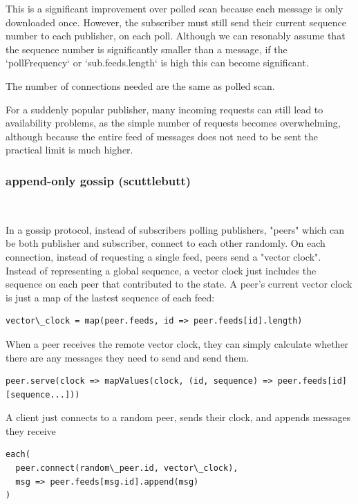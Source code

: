 \documentclass[sigconf]{acmart}
\begin{document}
This is a significant improvement over polled scan because each
message is only downloaded once.  However, the subscriber must still
send their current sequence number to each publisher, on each poll.
Although we can resonably assume that the sequence number is
significantly smaller than a message, if the `pollFrequency` or
`sub.feeds.length` is high this can become significant.

The number of connections needed are the same as polled scan.

For a suddenly popular publisher, many incoming requests can still
lead to availability problems, as the simple number of requests
becomes overwhelming, although because the entire feed of messages
does not need to be sent the practical limit is much higher.

\subsubsection{append-only gossip (scuttlebutt)}\ \\ \vspace{-1em}

In a gossip protocol, instead of subscribers polling publishers,
"peers" which can be both publisher and subscriber, connect to each
other randomly.  On each connection, instead of requesting a single
feed, peers send a "vector clock".  Instead of representing a global
sequence, a vector clock just includes the sequence on each peer that
contributed to the state. A peer's current vector clock is just a map
of the lastest sequence of each feed:

\begin{verbatim}
vector\_clock = map(peer.feeds, id => peer.feeds[id].length)
\end{verbatim}

When a peer receives the remote vector clock, they can simply
calculate whether there are any messages they need to send and send
them.

\begin{verbatim}
peer.serve(clock => mapValues(clock, (id, sequence) => peer.feeds[id][sequence...]))
\end{verbatim}

A client just connects to a random peer, sends their clock, and
appends messages they receive

\begin{verbatim}
each(
  peer.connect(random\_peer.id, vector\_clock),
  msg => peer.feeds[msg.id].append(msg)
)
\end{verbatim}
\end{document}
